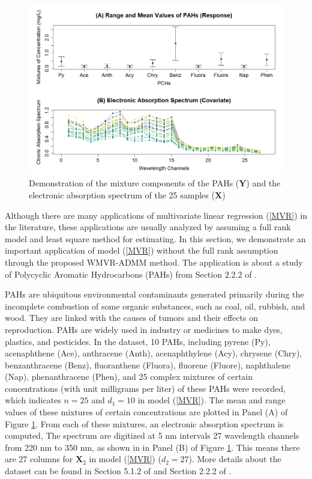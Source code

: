 \documentclass[alpha-refs]{wiley-article}
\begin{document}
\begin{figure}[b!]
    \centering
    \includegraphics[width = 120mm]{Figure/S6_P1.pdf}
    \caption{Demonstration of the mixture components of the PAHs ($\boldsymbol{Y}$) and the electronic absorption spectrum of the 25 samples ($\boldsymbol{X}$)}
    \label{fig:Realdata_XY}
\end{figure}

Although there are many applications of multivariate linear regression (\ref{MVR}) in the literature, these applications are usually analyzed by assuming a full rank model and least square method for estimating.
In this section, we demonstrate an important application of model (\ref{MVR}) without the full rank assumption through the proposed WMVR-ADMM method.
The application is about a study of Polycyclic Aromatic Hydrocarbons (PAHs) from Section $2.2.2$ of \citet{isenmann2008modern}.

PAHs are ubiquitous environmental contaminants generated primarily during the incomplete combustion of some organic substances, such as coal, oil, rubbish, and wood. They are linked with the causes of tumors and their effects on reproduction. PAHs are widely used in industry or medicines to make dyes, plastics, and pesticides. In the dataset, 10 PAHs, including pyrene (Py), acenaphthene (Ace), anthracene (Anth), acenaphthylene (Acy), chrysene (Chry), benzanthracene (Benz), fluoranthene (Fluora), fluorene (Fluore), naphthalene (Nap), phenanthracene (Phen), and 25 complex mixtures of certain concentrations (with unit milligrams per liter) of these PAHs were recorded, which indicates $n = 25$ and $d_{1} = 10$ in model (\ref{MVR}). The mean and range values of these mixtures of certain concentrations are plotted in Panel (A) of Figure \ref{fig:Realdata_XY}.
From each of these mixtures, an electronic absorption spectrum is computed, The spectrum are digitized at 5 nm intervals 27 wavelength channels from 220 nm to 350 nm, as shown in in Panel (B) of Figure \ref{fig:Realdata_XY}.  This means there are 27 columns for $\boldsymbol{X}_{2}$ in model (\ref{MVR}) ($d_{2}  = 27$). More details about the dataset can be found in Section 5.1.2 of \citet{brereton2003chemometrics} and Section 2.2.2 of \citet{isenmann2008modern}.
\end{document}
